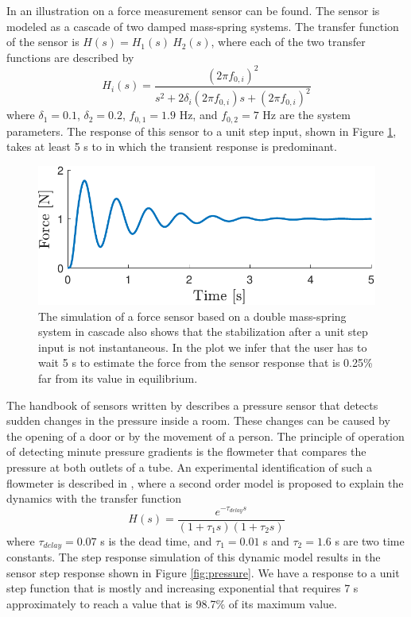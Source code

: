 In \citet{Eichstadt12} an illustration on a force measurement sensor can be found. 
The sensor is modeled as a cascade of two damped mass-spring systems. 
The transfer function of the sensor is $H(s) = H_1(s) \ H_2(s)$, where each of the two transfer functions are described by
\begin{equation} H_i(s) = \dfrac{\left( 2 \pi f_{0,i}\right)^2}{s^2  + 2 \delta_i \left( 2 \pi f_{0,i}\right) s  +  \left( 2 \pi f_{0,i}\right)^2} 
\end{equation}  
where $\delta_1 = 0.1$, $\delta_2 = 0.2$, $f_{0,1} = 1.9$ Hz, and $f_{0,2} = 7$ Hz are the system parameters.
The response of this sensor to a unit step input, shown in Figure \ref{fig:force}, takes at least 5 s to in which the transient response is predominant.  

\begin{figure}[!htbp]
\centering
\includegraphics[width=0.69\columnwidth]{./ChapterIntroduction/fig/Fig_4.pdf} 
\caption{ \label{fig:force} 
\color{blue} The simulation of a force sensor based on a double mass-spring system in cascade also shows that the stabilization after a unit step input is not instantaneous. In the plot we infer that the user has to wait 5 s to estimate the force from the sensor response that is 0.25\% far from its value in equilibrium. \color{black}  }
\end{figure}

The handbook of sensors written by \citet{Fraden16Book} describes a pressure sensor that detects sudden changes in the pressure inside a room.
These changes can be caused by the opening of a door or by the movement of a person.
The principle of operation of detecting minute pressure gradients is the flowmeter that compares the pressure at both outlets of a tube.   
An experimental identification of such a flowmeter is described in \citet{Wiklund02}, where a second order model is proposed to explain the dynamics with the transfer function
\begin{equation} H(s) = \dfrac{ e^{-\tau_{delay}s}}{\left( 1 +  \tau_1 s \right) \left( 1 +  \tau_2 s \right)} 
\end{equation}  
where $\tau_{delay} = 0.07$ s is the dead time, and $\tau_{1} = 0.01$ s and $\tau_{2} = 1.6$ s are two time constants.
The step response simulation of this dynamic model results in the sensor step response shown in Figure \ref{fig:pressure}.  
We have a response to a unit step function that is mostly and increasing exponential that requires 7 s approximately to reach a value that is 98.7\% of its maximum value.

